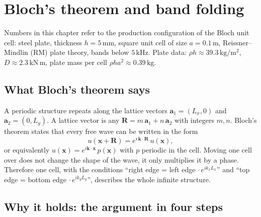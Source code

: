 
\chapter{Bloch's theorem and band folding}
\label{ch:bloch}

Numbers in this chapter refer to the production configuration of the Bloch
unit cell: steel plate, thickness $h = 5\,\mathrm{mm}$, square unit cell of
size $a = 0.1\,\mathrm{m}$, Reissner--Mindlin (RM) plate theory, bands below
$5\,\mathrm{kHz}$. Plate data: $\rho h \approx 39.3\,\mathrm{kg/m^2}$,
$D \approx 2.3\,\mathrm{kN\,m}$, plate mass per cell
$\rho h a^2 \approx 0.39\,\mathrm{kg}$.

\section{What Bloch's theorem says}

A periodic structure repeats along the lattice vectors
$\mathbf{a}_1 = (L_x, 0)$ and $\mathbf{a}_2 = (0, L_y)$. A lattice vector is
any $\mathbf{R} = m\,\mathbf{a}_1 + n\,\mathbf{a}_2$ with integers $m, n$.
Bloch's theorem states that every free wave can be written in the form
\begin{equation}
  u(\mathbf{x} + \mathbf{R}) = e^{i\,\mathbf{k}\cdot\mathbf{R}}\, u(\mathbf{x}),
  \label{eq:bloch}
\end{equation}
or equivalently $u(\mathbf{x}) = e^{i\mathbf{k}\cdot\mathbf{x}}\,p(\mathbf{x})$
with $p$ periodic in the cell. Moving one cell over does not change the shape
of the wave, it only multiplies it by a phase. Therefore one cell, with the
conditions ``right edge = left edge $\cdot\, e^{i k_x L_x}$'' and
``top edge = bottom edge $\cdot\, e^{i k_y L_y}$'', describes the whole
infinite structure.

\section{Why it holds: the argument in four steps}

